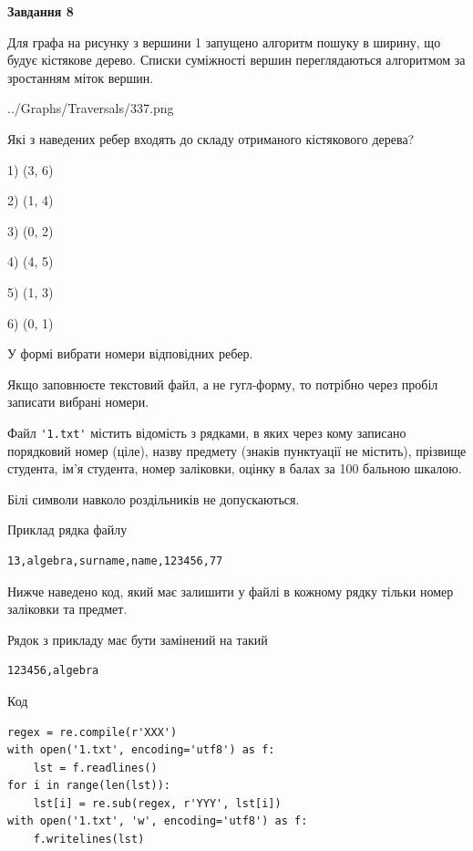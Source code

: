 \documentclass[12pt, ukrainian]{article}
\def\code#1{\Verb!#1!}
\begin{document}
{\begin {large}
{\begin {center}\textbf{Завдання 8}\end {center}}\par
Для графа на рисунку з вершини 1 запущено алгоритм пошуку в ширину, що будує кістякове дерево. Списки суміжності вершин переглядаються алгоритмом за зростанням міток вершин.\par
\begin{center}
	{../Graphs/Traversals/337.png}
\end{center}
\par Які з наведених ребер входять до складу отриманого кістякового дерева?\par
1) (3, 6)\par
2) (1, 4)\par
3) (0, 2)\par
4) (4, 5)\par
5) (1, 3)\par
6) (0, 1)\par
{\vskip 15pt} У формі вибрати номери відповідних ребер.


Якщо заповнюєте текстовий файл, а не гугл-форму, то потрібно через пробіл записа\-ти вибрані номери.\par
\newpage


Файл \code{'1.txt'} містить відомість з рядками, в яких через кому записано поряд\-ковий номер (ціле), назву предмету (знаків пунктуації не містить), прізвище студента, ім'я студента, номер заліковки, оцінку в балах за 100 бальною шкалою.

Білі символи навколо роздільників не допускаються.

Приклад рядка файлу



\begin{verbatim}
13,algebra,surname,name,123456,77
\end{verbatim}


Нижче наведено код, який має залишити у файлі в кожному рядку тільки номер заліковки та предмет.

Рядок з прикладу має бути замінений на такий



\begin{verbatim}
123456,algebra
\end{verbatim}




Код



\begin{verbatim}
regex = re.compile(r'XXX')
with open('1.txt', encoding='utf8') as f:
    lst = f.readlines()
for i in range(len(lst)):
    lst[i] = re.sub(regex, r'YYY', lst[i])
with open('1.txt', 'w', encoding='utf8') as f:
    f.writelines(lst)
\end{verbatim}







\end{large}}
\end{document}
